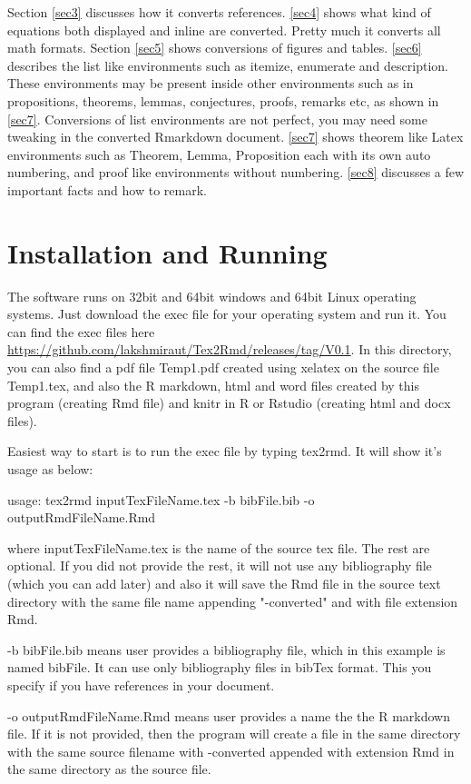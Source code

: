 \documentclass[12pt,svgnames]{article}
\begin{document}
Section \ref{sec3} discusses how it converts references. \autoref{sec4} shows what kind of equations both displayed and inline are converted. Pretty much it converts all math formats. Section \ref{sec5} shows conversions of figures and tables. \autoref{sec6} describes the list like environments such as itemize, enumerate and description. These environments may be present inside other environments such as in propositions, theorems, lemmas, conjectures, proofs, remarks etc, as shown in \autoref{sec7}. Conversions of list environments are not perfect, you may need some tweaking in the converted Rmarkdown document. \autoref{sec7} shows theorem like Latex environments such as Theorem, Lemma, Proposition each with its own auto numbering, and proof like environments without numbering. \autoref{sec8} discusses a few important facts and how to remark.

\section{Installation and Running}\label{sec2}
The software runs on 32bit and 64bit windows and 64bit Linux operating systems.  Just download the exec file for your operating system and run it. You can find the exec files here \url{https://github.com/lakshmiraut/Tex2Rmd/releases/tag/V0.1}. In this directory, you can also find a pdf file Temp1.pdf created using xelatex on the source file Temp1.tex, and also the R markdown, html and word files created by this program (creating Rmd file) and knitr in R or Rstudio (creating html and docx files).

Easiest way to start is to run the exec file by typing tex2rmd. It will show it's usage as below:

usage: tex2rmd inputTexFileName.tex -b bibFile.bib -o outputRmdFileName.Rmd 

where inputTexFileName.tex is the name of the source tex file. The rest are optional. If you did not provide the rest, it will not use any bibliography file (which you can add later) and also it will save the Rmd file in the source text directory with the same file name appending "-converted" and with file extension Rmd.  

-b bibFile.bib means user provides a bibliography file, which in this example is named bibFile.  It can use only bibliography files in bibTex format. This you specify if you have references in your document.

-o outputRmdFileName.Rmd means user provides a name the the R markdown file. If it is not provided, then the program will create a file in the same directory with the same source filename with -converted appended with extension Rmd in the same directory as the source file.
\end{document}
